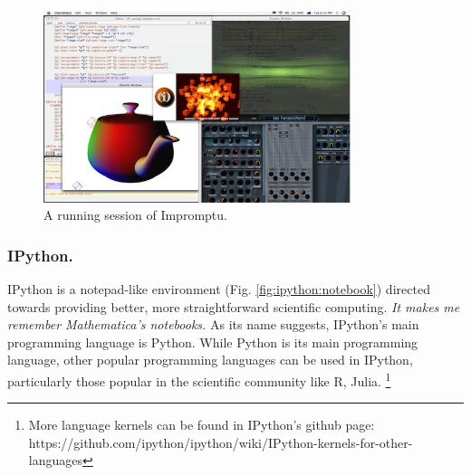 \documentclass{./llncs2e/llncs}
\begin{document}
	\begin{figure}
		\centering
		\includegraphics[width=0.8\textwidth]{img/impromptu_example}
		\caption{A running session of Impromptu.}
		\label{fig:ex:impromptu}
	\end{figure}
	
	
\subsubsection{IPython.}
	IPython\cite{PER-GRA:2007} is a notepad-like environment (Fig. \ref{fig:ipython:notebook}) directed towards providing better, more straightforward scientific computing. \emph{It makes me remember Mathematica's notebooks.} As its name suggests, IPython's main programming language is Python. 
	While Python is its main programming language, other popular programming languages can be used in IPython, particularly those popular in the scientific community like R, Julia. \footnote{More language kernels can be found in IPython's github page: https://github.com/ipython/ipython/wiki/IPython-kernels-for-other-languages}
	
\end{document}
